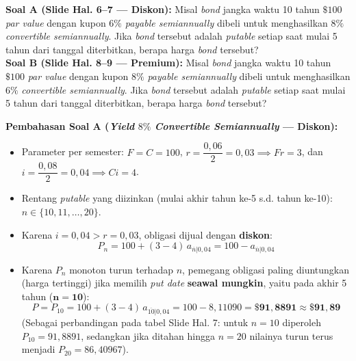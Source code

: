 \documentclass[11pt,a4paper]{article}
\begin{document}
\begin{examplebox}
\textbf{Soal A (Slide Hal. 6--7 --- Diskon):} Misal \textit{bond} jangka waktu 10 tahun $\$100$ \textit{par value} dengan kupon $6\%$ \textit{payable semiannually} dibeli untuk menghasilkan $8\%$ \textit{convertible semiannually}. Jika \textit{bond} tersebut adalah \textit{putable} setiap saat mulai 5 tahun dari tanggal diterbitkan, berapa harga \textit{bond} tersebut?\\[0.4em]
\textbf{Soal B (Slide Hal. 8--9 --- Premium):} Misal \textit{bond} jangka waktu 10 tahun $\$100$ \textit{par value} dengan kupon $8\%$ \textit{payable semiannually} dibeli untuk menghasilkan $6\%$ \textit{convertible semiannually}. Jika \textit{bond} tersebut adalah \textit{putable} setiap saat mulai 5 tahun dari tanggal diterbitkan, berapa harga \textit{bond} tersebut?

\tcblower
\textbf{Pembahasan Soal A (\textit{Yield} $8\%$ \textit{Convertible Semiannually} --- Diskon):}
\begin{itemize}[topsep=2pt, itemsep=2pt]
    \item Parameter per semester: $F = C = 100$, $r = \dfrac{0{,}06}{2} = 0{,}03 \implies Fr = 3$, dan $i = \dfrac{0{,}08}{2} = 0{,}04 \implies Ci = 4$.
    \item Rentang \textit{putable} yang diizinkan (mulai akhir tahun ke-5 s.d. tahun ke-10): $n \in \{10, 11, \dots, 20\}$.
    \item Karena $i = 0{,}04 > r = 0{,}03$, obligasi dijual dengan \textbf{diskon}:
    \[
        P_n = 100 + (3 - 4)\,a_{\overline{n}|0{,}04} = 100 - a_{\overline{n}|0{,}04}
    \]
    \item Karena $P_n$ monoton turun terhadap $n$, pemegang obligasi paling diuntungkan (harga tertinggi) jika memilih \textit{put date} \textbf{seawal mungkin}, yaitu pada akhir 5 tahun ($\mathbf{n = 10}$):
    \[
        P = P_{10} = 100 + (3 - 4)\,a_{\overline{10}|0{,}04} = 100 - 8{,}11090 = \mathbf{\$91{,}8891 \approx \$91{,}89}
    \]
    {\footnotesize (Sebagai perbandingan pada tabel Slide Hal. 7: untuk $n=10$ diperoleh $P_{10} = 91{,}8891$, sedangkan jika ditahan hingga $n=20$ nilainya turun terus menjadi $P_{20} = 86{,}40967$).}
\end{itemize}


\end{examplebox}
\end{document}

